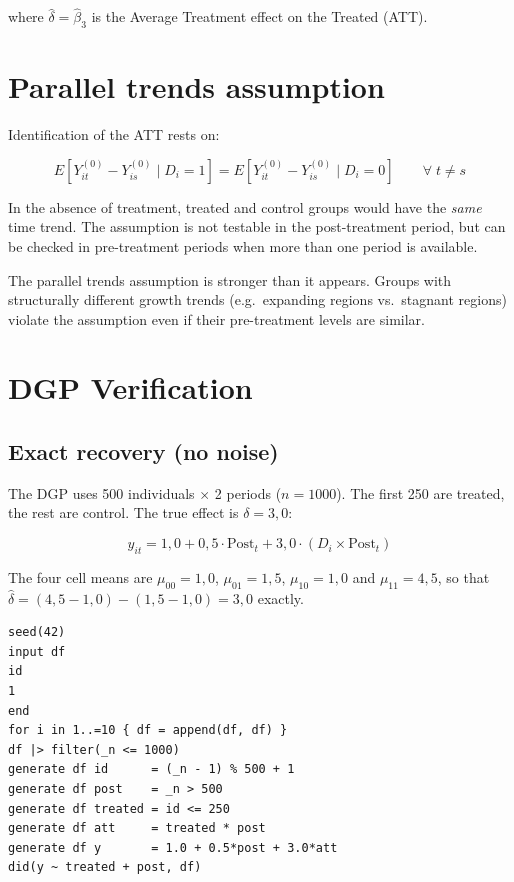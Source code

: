where $\hat\delta = \hat\beta_3$ is the Average Treatment effect on the Treated (ATT).

\section{Parallel trends assumption}

Identification of the ATT rests on:

\[
  E\!\left[Y_{it}^{(0)} - Y_{is}^{(0)} \mid D_i = 1\right]
  = E\!\left[Y_{it}^{(0)} - Y_{is}^{(0)} \mid D_i = 0\right]
  \qquad \forall\; t \neq s
\]

In the absence of treatment, treated and control groups would have the \emph{same}
time trend. The assumption is not testable in the post-treatment period,
but can be checked in pre-treatment periods when more than one
period is available.

\begin{aviso}
  The parallel trends assumption is stronger than it appears. Groups
  with structurally different growth trends (e.g.\ expanding regions
  vs.\ stagnant regions) violate the assumption even if their
  pre-treatment levels are similar.
\end{aviso}

\section{DGP Verification}

\subsection*{Exact recovery (no noise)}

The DGP uses 500 individuals $\times$ 2 periods ($n = 1000$). The first 250
are treated, the rest are control. The true effect is $\delta = 3{,}0$:

\[
  y_{it} = 1{,}0 + 0{,}5\cdot\text{Post}_t + 3{,}0\cdot(D_i\times\text{Post}_t)
\]

The four cell means are $\mu_{00}=1{,}0$, $\mu_{01}=1{,}5$,
$\mu_{10}=1{,}0$ and $\mu_{11}=4{,}5$, so that
$\hat\delta = (4{,}5 - 1{,}0) - (1{,}5 - 1{,}0) = 3{,}0$ exactly.

\begin{lstlisting}[caption={Noise-free DiD DGP --- exact recovery}]
seed(42)
input df
id
1
end
for i in 1..=10 { df = append(df, df) }
df |> filter(_n <= 1000)
generate df id      = (_n - 1) % 500 + 1
generate df post    = _n > 500
generate df treated = id <= 250
generate df att     = treated * post
generate df y       = 1.0 + 0.5*post + 3.0*att
did(y ~ treated + post, df)
\end{lstlisting}

